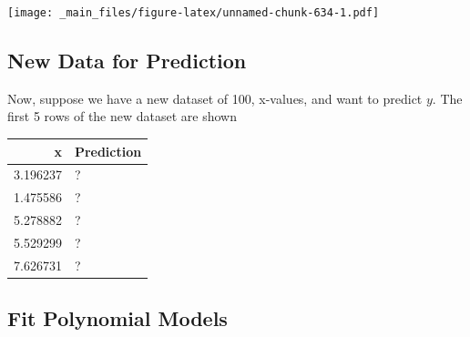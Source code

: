 \documentclass[]{book}
\begin{document}
\texttt{[image: \_main\_files/figure-latex/unnamed-chunk-634-1.pdf]}

\subsection{New Data for Prediction}\label{new-data-for-prediction}

Now, suppose we have a new dataset of 100, x-values, and want to predict
\(y\). The first 5 rows of the new dataset are shown

\begin{tabular}{r|l}
\hline
x & Prediction\\
\hline
3.196237 & ?\\
\hline
1.475586 & ?\\
\hline
5.278882 & ?\\
\hline
5.529299 & ?\\
\hline
7.626731 & ?\\
\hline
\end{tabular}

\subsection{Fit Polynomial Models}\label{fit-polynomial-models}
\end{document}
